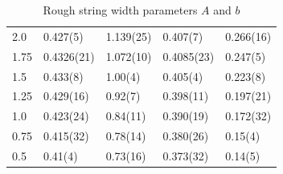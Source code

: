\begin{table}[!hb]
\begin{tabular}{lllll}
   2.0 & 0.427(5) & 1.139(25) & 0.407(7) & 0.266(16) \\
   1.75 & 0.4326(21) & 1.072(10) & 0.4085(23) & 0.247(5) \\
   1.5 & 0.433(8) & 1.00(4) & 0.405(4) & 0.223(8) \\
   1.25 & 0.429(16) & 0.92(7) & 0.398(11) & 0.197(21) \\
   1.0 & 0.423(24) & 0.84(11) & 0.390(19) & 0.172(32) \\
   0.75 & 0.415(32) & 0.78(14) & 0.380(26) & 0.15(4) \\
   0.5 & 0.41(4) & 0.73(16) & 0.373(32) & 0.14(5) \\
\end{tabular}
\caption{Rough string width parameters $A$ and $b$}
\end{table}
